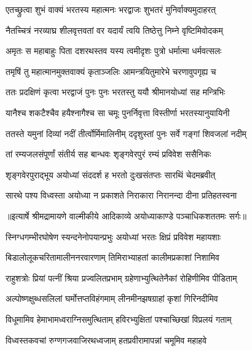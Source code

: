 \twolineshloka
{एतच्छ्रुत्वा शुभं वाक्यं भरतस्य महात्मनः}
{भरद्वाजः शुभतरं मुनिर्वाक्यमुदाहरत्} %

\twolineshloka
{नैतच्चित्रं नरव्याघ्र शीलवृत्तवतां वर}
{यदार्यं त्वयि तिष्ठेत्तु निम्ने वृष्टिमिवोदकम्} %

\twolineshloka
{अमृतः स महाबाहुः पिता दशरथस्तव}
{यस्य त्वमीदृशः पुत्रो धर्मात्मा धर्मवत्सलः} %

\twolineshloka
{तमृषिं तु महात्मानमुक्तवाक्यं कृताञ्जलिः}
{आमन्त्रयितुमारेभे चरणावुपगृह्य च} %

\twolineshloka
{ततः प्रदक्षिणं कृत्वा भरद्वाजं पुनः पुनः}
{भरतस्तु ययौ श्रीमानयोध्यां सह मन्त्रिभिः} %

\twolineshloka
{यानैश्च शकटैश्चैव हयैश्नागैश्च सा चमूः}
{पुनर्निवृत्ता विस्तीर्णा भरतस्यानुयायिनी} %

\twolineshloka
{ततस्ते यमुनां दिव्यां नदीं तीर्त्वोर्मिमालिनीम्}
{ददृशुस्तां पुनः सर्वे गङ्गां शिवजलां नदीम्} %

\twolineshloka
{तां रम्यजलसंपूर्णां संतीर्य सह बान्धवः}
{शृङ्गवेरपुरं रम्यं प्रविवेश ससैनिकः} %

\twolineshloka
{शृङ्गवेरपुराद्भूय अयोध्यां संददर्श ह}
{भरतो दुःखसंतप्तः सारथिं चेदमब्रवीत्} %

\twolineshloka
{सारथे पश्य विध्वस्ता अयोध्या न प्रकाशते}
{निराकारा निरानन्दा दीना प्रतिहतस्वना} %


{॥इत्यार्षे श्रीमद्रामायणे वाल्मीकीये आदिकाव्ये अयोध्याकाण्डे पञ्चाधिकशततमः सर्गः॥}


\twolineshloka
{स्निग्धगम्भीरघोषेण स्यन्दनेनोपयान्प्रभुः}
{अयोध्यां भरतः क्षिप्रं प्रविवेश महायशाः} %

\twolineshloka
{बिडालोलूकचरितामालीननरवारणाम्}
{तिमिराभ्याहतां कालीमप्रकाशां निशामिव} %

\twolineshloka
{राहुशत्रोः प्रियां पत्नीं श्रिया प्रज्वलितप्रभाम्}
{ग्रहेणाभ्युत्थितेनैकां रोहिणीमिव पीडिताम्} %

\twolineshloka
{अल्पोष्णक्षुब्धसलिलां घर्मोत्तप्तविहंगमाम्}
{लीनमीनझषग्राहां कृशां गिरिनदीमिव} %

\twolineshloka
{विधूमामिव हेमाभामध्वराग्निसमुत्थिताम्}
{हविरभ्युक्षितां पश्चाच्छिखां विप्रलयं गताम्} %

\twolineshloka
{विध्वस्तकवचां रुग्णगजवाजिरथध्वजाम्}
{हतप्रवीरामापन्नां चमूमिव महाहवे} %

